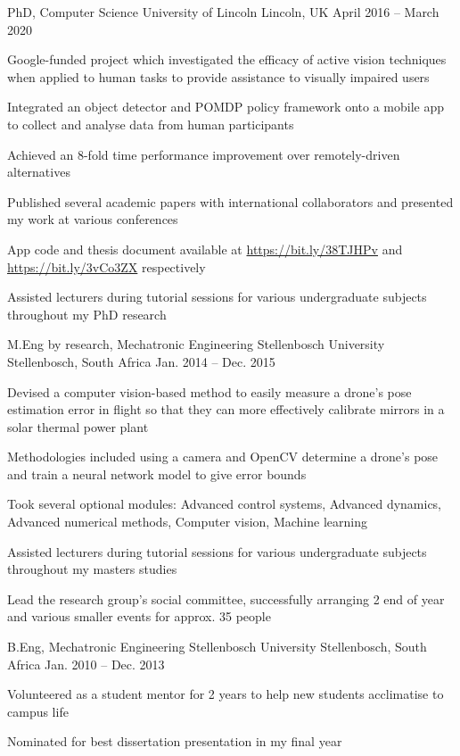 \documentclass[11pt,a4paper]{awesome-cv}        %
\begin{document}
\begin{cventries}
  \cventry
  {PhD, Computer Science}
  {University of Lincoln}
  {Lincoln, UK}
  {April 2016 -- March 2020}
  {
    \begin{cvitems}
      \item Google-funded project which investigated the efficacy of active vision techniques when applied to human tasks to provide assistance to visually impaired users
      \item Integrated an object detector and POMDP policy framework onto a mobile app to collect and analyse data from human participants
      \item Achieved an 8-fold time performance improvement over remotely-driven alternatives
      \item Published several academic papers with international collaborators and presented my work at various conferences
      \item App code and thesis document available at \url{https://bit.ly/38TJHPv} and \url{https://bit.ly/3vCo3ZX} respectively
      \item Assisted lecturers during tutorial sessions for various undergraduate subjects throughout my PhD research
    \end{cvitems}
  }
  \cventry
  {M.Eng by research, Mechatronic Engineering}
  {Stellenbosch University}
  {Stellenbosch, South Africa}
  {Jan. 2014 -- Dec. 2015}
  {
    \begin{cvitems}
      \item Devised a computer vision-based method to easily measure a drone's pose estimation error in flight so that they can more effectively calibrate mirrors in a solar thermal power plant
      \item Methodologies included using a camera and OpenCV determine a drone's pose and train a neural network model to give error bounds
      \item Took several optional modules: Advanced control systems, Advanced dynamics, Advanced numerical methods, Computer vision, Machine learning
      \item Assisted lecturers during tutorial sessions for various undergraduate subjects throughout my masters studies
      \item Lead the research  group's social committee, successfully arranging 2 end of year and various smaller events for approx. 35 people
    \end{cvitems}
  }
  \cventry
  {B.Eng, Mechatronic Engineering}
  {Stellenbosch University}
  {Stellenbosch, South Africa}
  {Jan. 2010 -- Dec. 2013}
  {
    \begin{cvitems}
      \item Volunteered as a student mentor for 2 years to help new students acclimatise to campus life
      \item Nominated for best dissertation presentation in my final year
    \end{cvitems}
  }  
\end{cventries}
\end{document}
